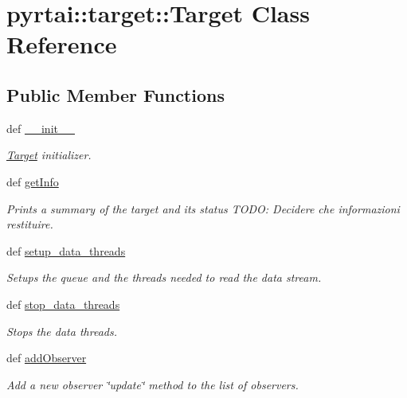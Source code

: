 \hypertarget{classpyrtai_1_1target_1_1_target}{
\section{pyrtai\-:\-:target\-:\-:\-Target \-Class \-Reference}
\label{classpyrtai_1_1target_1_1_target}
}
\subsection*{\-Public \-Member \-Functions}
\begin{DoxyCompactItemize}
\item 
def \hyperlink{classpyrtai_1_1target_1_1_target_ad89e94e6a5cf413af9ad91dd9b83670b}{\-\_\-\-\_\-init\-\_\-\-\_\-}
\begin{DoxyCompactList}\small\item\em \hyperlink{classpyrtai_1_1target_1_1_target}{\-Target} initializer. \end{DoxyCompactList}\item 
def \hyperlink{classpyrtai_1_1target_1_1_target_a9674793e75bd351e481791b881c0f9da}{get\-Info}
\begin{DoxyCompactList}\small\item\em \-Prints a summary of the target and its status \-T\-O\-D\-O\-: \-Decidere che informazioni restituire. \end{DoxyCompactList}\item 
def \hyperlink{classpyrtai_1_1target_1_1_target_ab0cfc0e5b6ac03cf654879045d7b9a13}{setup\-\_\-data\-\_\-threads}
\begin{DoxyCompactList}\small\item\em \-Setups the queue and the threads needed to read the data stream. \end{DoxyCompactList}\item 
def \hyperlink{classpyrtai_1_1target_1_1_target_ae0dd80c9557257d45fbae2d7d7a18ddf}{stop\-\_\-data\-\_\-threads}
\begin{DoxyCompactList}\small\item\em \-Stops the data threads. \end{DoxyCompactList}\item 
def \hyperlink{classpyrtai_1_1target_1_1_target_a792bae526bddd673ef6e07f4c57930b0}{add\-Observer}
\begin{DoxyCompactList}\small\item\em \-Add a new observer \char`\"{}update\char`\"{} method to the list of observers. \end{DoxyCompactList}\item 

\end{DoxyCompactItemize}

